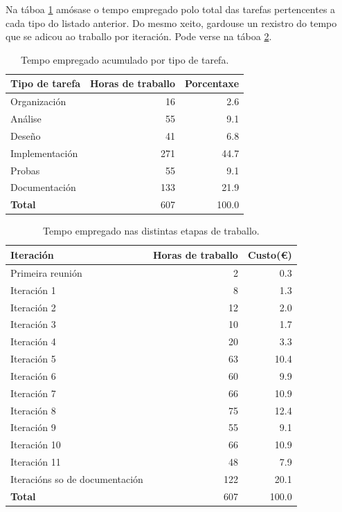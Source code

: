 Na táboa \ref{tab:tipo} amósase o tempo empregado polo total das tarefas pertencentes a cada tipo do listado anterior. Do mesmo xeito, gardouse un rexistro do tempo que se adicou ao traballo por iteración. Pode verse na táboa \ref{tab:custo}.

\begin{table}[H]
	\centering
	\begin{tabular}{|p{8cm}|r|r|}
		\hline
		\rowcolor{blue!10}
		Tipo de tarefa & Horas de traballo & Porcentaxe \\
		\hline
		Organización & 16 &  2.6\\
		\hline
		Análise & 55 &  9.1\\
		\hline
		Deseño & 41 &  6.8\\
		\hline
		Implementación & 271 &  44.7\\
		\hline
		Probas & 55 &  9.1\\
		\hline
		Documentación & 133 &  21.9\\
		\hline
		\textbf{Total} & 607 &  100.0\\
		\hline
	\end{tabular}
	\caption{Tempo empregado acumulado por tipo de tarefa.}
	\label{tab:tipo}
\end{table}


\begin{table}[H]
	\centering
	\begin{tabular}{|p{8cm}|r|r|}
		\hline
		\rowcolor{blue!10}
		Iteración & Horas de traballo & Custo(€)\\
		\hline
		Primeira reunión & 2 &  0.3\\
		\hline
		Iteración 1 & 8 &  1.3\\
		\hline
		Iteración 2 & 12 &  2.0\\
		\hline
		Iteración 3 & 10 &  1.7\\
		\hline
		Iteración 4 & 20 &  3.3\\
		\hline
		Iteración 5 & 63 &  10.4\\
		\hline
		Iteración 6 & 60 &  9.9\\
		\hline
		Iteración 7 & 66 &  10.9\\
		\hline
		Iteración 8 & 75 &  12.4\\
		\hline
		Iteración 9 & 55 &  9.1\\
		\hline
		Iteración 10 & 66 &  10.9\\
		\hline
		Iteración 11 &  48 &  7.9\\
		\hline
		Iteracións so de documentación & 122 & 20.1\\
		\hline
		\textbf{Total} & 607 & 100.0 \\
		\hline
	\end{tabular}
	\caption{Tempo empregado nas distintas etapas de traballo.}
	\label{tab:custo}
\end{table}





